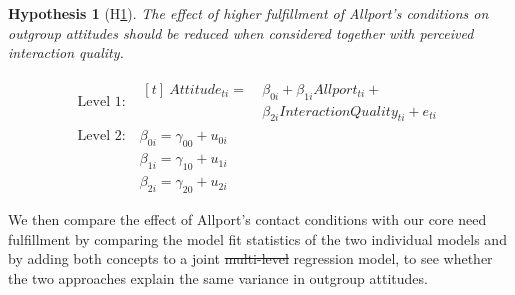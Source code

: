 \documentclass[man, 12pt, a4paper, mask]{apa7}
\theoremstyle{break}
\theoremstyle{plain}
\newtheorem{subhyp}{Hypothesis}
\providecommand{\DIFaddtex}[1]{{\protect\color{blue}\uwave{#1}}} %
\providecommand{\DIFdeltex}[1]{{\protect\color{red}\sout{#1}}}                      %
\providecommand{\DIFaddbegin}{} %
\providecommand{\DIFaddend}{} %
\providecommand{\DIFdelbegin}{} %
\providecommand{\DIFdelend}{} %
\providecommand{\DIFadd}[1]{\texorpdfstring{\DIFaddtex{#1}}{#1}} %
\providecommand{\DIFdel}[1]{\texorpdfstring{\DIFdeltex{#1}}{}} %
\newcommand{\DIFscaledelfig}{0.5}
\newlength{\DIFdelgraphicswidth} %
\newlength{\DIFdelgraphicsheight} %
\newcommand{\DIFaddincludegraphics}[2][]{{\color{blue}\fbox{\DIFOincludegraphics[#1]{#2}}}} %
\newcommand{\DIFdelincludegraphics}[2][]{%
\sbox{\DIFdelgraphicsbox}{\DIFOincludegraphics[#1]{#2}}%
\settoboxwidth{\DIFdelgraphicswidth}{\DIFdelgraphicsbox} %
\settoboxtotalheight{\DIFdelgraphicsheight}{\DIFdelgraphicsbox} %
\scalebox{\DIFscaledelfig}{%
\parbox[b]{\DIFdelgraphicswidth}{\usebox{\DIFdelgraphicsbox}\\[-\baselineskip] \rule{\DIFdelgraphicswidth}{0em}}\llap{\resizebox{\DIFdelgraphicswidth}{\DIFdelgraphicsheight}{%
\setlength{\unitlength}{\DIFdelgraphicswidth}%
\begin{picture}(1,1)%
\thicklines\linethickness{2pt} %
{\color[rgb]{1,0,0}\put(0,0){\framebox(1,1){}}}%
{\color[rgb]{1,0,0}\put(0,0){\line( 1,1){1}}}%
{\color[rgb]{1,0,0}\put(0,1){\line(1,-1){1}}}%
\end{picture}%
}\hspace*{3pt}}} %
} %
\DeclareRobustCommand{\DIFaddbegin}{\DIFOaddbegin \let\includegraphics\DIFaddincludegraphics} %
\DeclareRobustCommand{\DIFaddend}{\DIFOaddend \let\includegraphics\DIFOincludegraphics} %
\DeclareRobustCommand{\DIFdelbegin}{\DIFOdelbegin \let\includegraphics\DIFdelincludegraphics} %
\DeclareRobustCommand{\DIFdelend}{\DIFOaddend \let\includegraphics\DIFOincludegraphics} %
\begin{document}
\begin{mdframed}[style=mdfhypothesis]
    \begin{subhyp}[H\ref{hyp:AttAllportQual}] \label{hyp:AttAllportQual}
    \addtolength{\leftskip}{\subhypskip}
    The effect of higher fulfillment of Allport's conditions on outgroup attitudes should be reduced when considered together with perceived interaction quality.
    \end{subhyp}

    \begin{fleqn}[\eqskip]
      \begin{equation} \label{eq:SlopesAttAllportQual}
        \begin{split}
          \textrm{Level 1:} &
            \begin{aligned}[t]
              \ Attitude_{ti} =  &\ \beta_{0i} + \beta_{1i}Allport_{ti} + \\
                                 &\ \beta_{2i}InteractionQuality_{ti} + e_{ti}
            \end{aligned} \\
          \textrm{Level 2:} &\ \beta_{0i} = \gamma_{00} + u_{0i} \\
                            &\ \beta_{1i} = \gamma_{10} + u_{1i} \\
                            &\ \beta_{2i} = \gamma_{20} + u_{2i}
        \end{split} 
      \end{equation}
    \end{fleqn}
\end{mdframed}

We then compare the effect of Allport's contact conditions with our core need fulfillment by comparing the model fit statistics of the two individual models and by adding both concepts to a joint \DIFdelbegin \DIFdel{multi-level }\DIFdelend \DIFaddbegin \DIFadd{multilevel }\DIFaddend regression model, to see whether the two approaches explain the same variance in outgroup attitudes.
\end{document}
